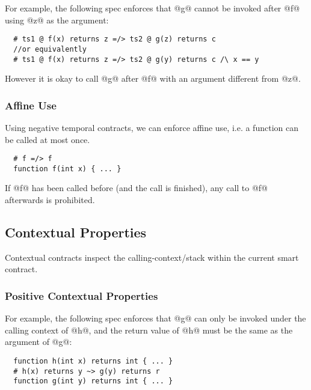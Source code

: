 \documentclass[acmsmall,review,anonymous]{acmart}\settopmatter{printfolios=true,printccs=false,printacmref=false}
\begin{document}
For example, the following spec enforces that @g@ cannot be
invoked after @f@ using @z@ as the argument:
\begin{lstlisting}
  # ts1 @ f(x) returns z =/> ts2 @ g(z) returns c
  //or equivalently
  # ts1 @ f(x) returns z =/> ts2 @ g(y) returns c /\ x == y
\end{lstlisting}
However it is okay to call @g@ after @f@ with an argument different from @z@.

\subsubsection*{Affine Use}

Using negative temporal contracts, we can enforce affine use, i.e.
a function can be called at most once.
\begin{lstlisting}
  # f =/> f
  function f(int x) { ... }
\end{lstlisting}
If @f@ has been called before (and the call is finished), any
call to @f@ afterwards is prohibited.



\subsection{Contextual Properties}

Contextual contracts inspect the calling-context/stack within the
current smart contract.


\subsubsection{Positive Contextual Properties}

For example, the following spec enforces that @g@ can only be invoked
under the calling context of @h@, and the return value of @h@ must be
the same as the argument of @g@:

\begin{lstlisting}
  function h(int x) returns int { ... }
  # h(x) returns y ~> g(y) returns r
  function g(int y) returns int { ... }
\end{lstlisting}
\end{document}
